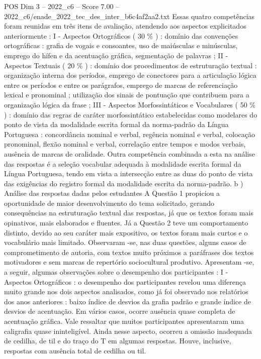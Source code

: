 \begin{textsample}{POS Dim 3 – 2022\_c6 – Score 7.00 – 2022\_c6/enade\_2022\_tec\_des\_inter\_b6c4af2aa2.txt}
Essas quatro competências foram reunidas em três itens de avaliação, atendendo aos aspectos explicitados anteriormente : I - Aspectos Ortográficos ( 30 \% ) : domínio das convenções ortográficas : grafia de vogais e consoantes, uso de maiúsculas e minúsculas, emprego do hífen e da acentuação gráfica, segmentação de palavras ; II - Aspectos Textuais ( 20 \% ) : domínio dos procedimentos de estruturação textual : organização interna dos períodos, emprego de conectores para a articulação lógica entre os períodos e entre os parágrafos, emprego de marcas de referenciação lexical e pronominal ; utilização dos sinais de pontuação que contribuem para a organização lógica da frase ; III - Aspectos Morfossintáticos e Vocabulares ( 50 \% ) : domínio das regras de caráter morfossintático estabelecidas como modelares do ponto de vista da modalidade escrita formal da norma-padrão da Língua Portuguesa : concordância nominal e verbal, regência nominal e verbal, colocação pronominal, flexão nominal e verbal, correlação entre tempos e modos verbais, ausência de marcas de oralidade.
Outra competência combinada a esta na análise das respostas é a seleção vocabular adequada à modalidade escrita formal da Língua Portuguesa, tendo em vista a intersecção entre as duas do ponto de vista das exigências do registro formal da modalidade escrita da norma-padrão. b ) Análise das respostas dadas pelos estudantes A Questão 1 propiciou a oportunidade de maior desenvolvimento do tema solicitado, gerando consequências na estruturação textual das respostas, já que os textos foram mais opinativos, mais elaborados e fluentes.
Já a Questão 2 teve um comportamento distinto, devido ao seu caráter mais expositivo, os textos foram mais curtos e o vocabulário mais limitado.
Observaram -se, nas duas questões, alguns casos de comprometimento de autoria, com textos muito próximos a paráfrases dos textos motivadores e sem marcas de repertório sociocultural produtivo.
Apresentam -se, a seguir, algumas observações sobre o desempenho dos participantes : I - Aspectos Ortográficos : o desempenho dos participantes revelou uma diferença muito grande nos dois aspectos analisados, como já foi observado nos relatórios dos anos anteriores : baixo índice de desvios da grafia padrão e grande índice de desvios de acentuação.
Em vários casos, ocorre ausência quase completa de acentuação gráfica.
Vale ressaltar que muitos participantes apresentaram uma caligrafia quase ininteligível.
Ainda nesse aspecto, ocorreu a omissão inadequada de cedilha, de til e do traço do T em algumas respostas.
Houve, inclusive, respostas com ausência total de cedilha ou til.

\end{textsample}
